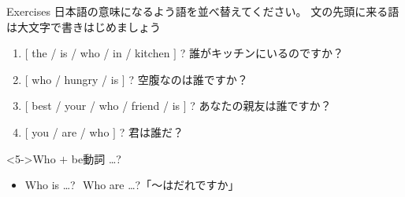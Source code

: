 \documentclass[aspectratio=169]{beamer}
\begin{document}
\begin{frame}[plain]{Exercises}
日本語の意味になるよう語を並べ替えてください。
文の先頭に来る語は大文字で書きはじめましょう\mbox{}\hfill{}

 \begin{enumerate}
  \item  $[$ the / is / who / in / kitchen $]$ ? 誰がキッチンにいるのですか？\\
  \item  $[$ who / hungry / is $]$ ? 空腹なのは誰ですか？\\
  \item  $[$ best / your / who / friend / is $]$ ? あなたの親友は誰ですか？\\
  \item  $[$ you / are / who $]$ ? 君は誰だ？\\
\end{enumerate}

\begin{block}<5->{Who $+$ be動詞 \ldots ?}
 \begin{itemize}[square]
  \item Who is \ldots{}?\,\, Who are \ldots{}?\hfill{}「～はだれですか」
 \end{itemize}
\end{block}
\end{frame}
\end{document}
